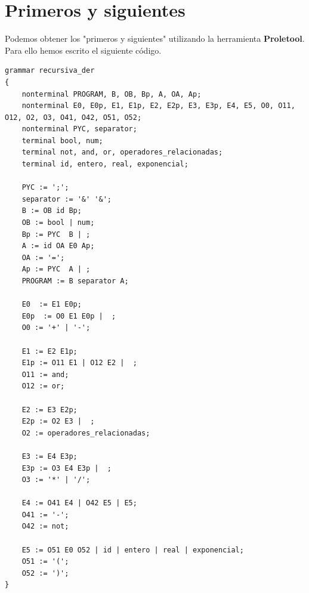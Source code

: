 \documentclass{article}
\begin{document}
\newpage 

\section{Primeros y siguientes}

Podemos obtener los "primeros y siguientes" utilizando la herramienta \textbf{Proletool}. Para ello hemos escrito el siguiente código.


\begin{lstlisting}
grammar recursiva_der  
{
	nonterminal PROGRAM, B, OB, Bp, A, OA, Ap;
	nonterminal E0, E0p, E1, E1p, E2, E2p, E3, E3p, E4, E5, O0, O11, O12, O2, O3, O41, O42, O51, O52;
	nonterminal PYC, separator;
	terminal bool, num;
	terminal not, and, or, operadores_relacionadas;
	terminal id, entero, real, exponencial;
	
	PYC := ';';
	separator := '&' '&';
	B := OB id Bp; 
	OB := bool | num;
	Bp := PYC  B | ;
	A := id OA E0 Ap;  
	OA := '=';
	Ap := PYC  A | ;
	PROGRAM := B separator A;
	
	E0  := E1 E0p;
	E0p  := O0 E1 E0p |  ;
	O0 := '+' | '-';  
	
	E1 := E2 E1p;  
	E1p := O11 E1 | O12 E2 |  ;
	O11 := and;
	O12 := or;
	
	E2 := E3 E2p;
	E2p := O2 E3 |  ;
	O2 := operadores_relacionadas;  
	
	E3 := E4 E3p;  
	E3p := O3 E4 E3p |  ;  
	O3 := '*' | '/';
	
	E4 := O41 E4 | O42 E5 | E5;
	O41 := '-'; 
	O42 := not;
	
	E5 := O51 E0 O52 | id | entero | real | exponencial;  
	O51 := '(';
	O52 := ')';
}  
\end{lstlisting}

\newpage
\end{document}
